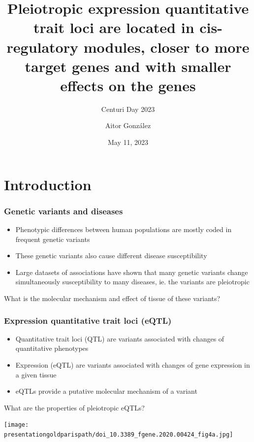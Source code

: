 \documentclass{beamer}
\title{Pleiotropic expression quantitative trait loci are located in cis-regulatory modules, closer to more target genes and with smaller effects on the genes}
\subtitle{Centuri Day 2023}
\author{Aitor Gonz\'alez}
\institute{Aix Marseille Univ, INSERM, TAGC}
\date{May 11, 2023}
\newcommand*{\presentationgoldparispath}{../presentation_230120_gold2022_paris/fig/}%
\begin{document}
\begin{frame}

\titlepage

\end{frame}


\section{Introduction} %

\begin{frame}
\frametitle{Genetic variants and diseases}

\begin{itemize}
\item Phenotypic differences between human populations are mostly coded in frequent genetic variants
\item These genetic variants also cause different disease susceptibility
\item Large datasets of associations have shown that many genetic variants change simultaneously susceptibility to many diseases, ie. the variants are pleiotropic
\end{itemize}
%
\vfill
%
What is the molecular mechanism and effect of tissue of these variants?

\end{frame}

\begin{frame}
\frametitle{Expression quantitative trait loci (eQTL)}

\begin{itemize}
\item Quantitative trait loci (QTL) are variants associated with changes of quantitative phenotypes
\item Expression (eQTL) are variants associated with changes of gene expression in a given tissue
\item eQTLs provide a putative molecular mechanism of a variant
\end{itemize}
%
\vfill
%
What are the properties of pleiotropic eQTLs?

\texttt{[image: \\presentationgoldparispath/doi\_10.3389\_fgene.2020.00424\_fig4a.jpg]}

\let\thefootnote\relax{}
\end{frame}
\end{document}
